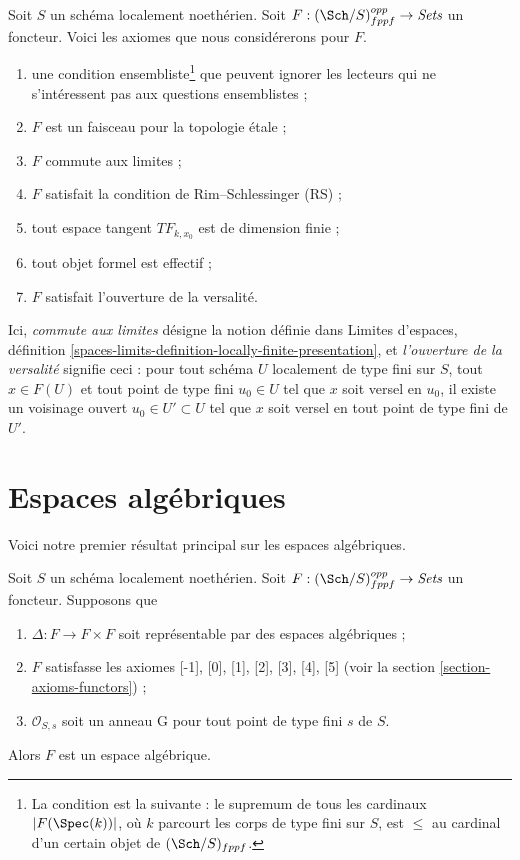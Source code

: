 \medskip\noindent
Soit $S$ un schéma localement noethérien. Soit
$F : (\Sch/S)_{fppf}^{opp} \to \textit{Sets}$ un foncteur.
Voici les axiomes que nous considérerons pour $F$.
\begin{enumerate}
\item[{[-1]}] une condition ensembliste\footnote{La condition est la suivante :
le supremum de tous les cardinaux $|F(\Spec(k))|$, où $k$ parcourt les corps
de type fini sur $S$, est $\leq$ au cardinal d'un certain objet de
$(\Sch/S)_{fppf}$.} que peuvent ignorer les lecteurs qui ne s'intéressent pas
aux questions ensemblistes ;
\item[{[0]}] $F$ est un faisceau pour la topologie étale ;
\item[{[1]}] $F$ commute aux limites ;
\item[{[2]}] $F$ satisfait la condition de Rim--Schlessinger (RS) ;
\item[{[3]}] tout espace tangent $TF_{k, x_0}$ est de dimension finie ;
\item[{[4]}] tout objet formel est effectif ;
\item[{[5]}] $F$ satisfait l'ouverture de la versalité.
\end{enumerate}
Ici, {\it commute aux limites} désigne la notion définie dans Limites
d'espaces, définition \ref{spaces-limits-definition-locally-finite-presentation},
et {\it l'ouverture de la versalité} signifie ceci : pour tout schéma $U$
localement de type fini sur $S$, tout $x \in F(U)$ et tout point de type fini
$u_0 \in U$ tel que $x$ soit versel en $u_0$, il existe un voisinage ouvert
$u_0 \in U' \subset U$ tel que $x$ soit versel en tout point de type fini de
$U'$.






\section{Espaces algébriques}
\label{section-algebraic-spaces}

\noindent
Voici notre premier résultat principal sur les espaces algébriques.

\begin{proposition}
\label{proposition-spaces-diagonal-representable}
Soit $S$ un schéma localement noethérien. Soit
$F : (\Sch/S)_{fppf}^{opp} \to \textit{Sets}$ un foncteur. Supposons que
\begin{enumerate}
\item $\Delta : F \to F \times F$ soit représentable par des espaces
algébriques ;
\item $F$ satisfasse les axiomes [-1], [0], [1], [2], [3], [4], [5] (voir la
section \ref{section-axioms-functors}) ;
\item $\mathcal{O}_{S, s}$ soit un anneau G pour tout point de type fini $s$
de $S$.
\end{enumerate}
Alors $F$ est un espace algébrique.
\end{proposition}

